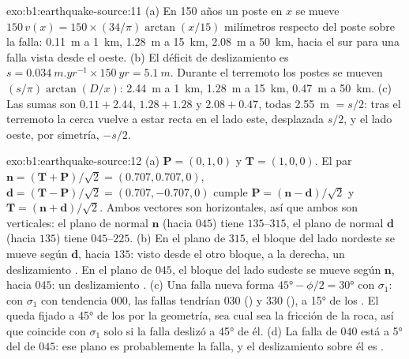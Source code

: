 \begin{solution}{exo:b1:earthquake-source:11}
(a) En 150 años un poste en $x$ se mueve $150\,v(x) = 150\times(34/\pi)
\arctan(x/15)$ milímetros respecto del poste sobre la falla: \qty{0.11}{m} a
\qty{1}{km}, \qty{1.28}{m} a \qty{15}{km}, \qty{2.08}{m} a \qty{50}{km},
hacia el sur para una falla  vista desde el oeste. (b) El déficit de deslizamiento es
$s = \qty{0.034}{m.yr^{-1}}\times\qty{150}{yr} = \qty{5.1}{m}$. Durante el
terremoto los postes se mueven $(s/\pi)\arctan(D/x)$: \qty{2.44}{m} a
\qty{1}{km}, \qty{1.28}{m} a \qty{15}{km}, \qty{0.47}{m} a \qty{50}{km}.
(c) Las sumas son $0.11 + 2.44$, $1.28 + 1.28$ y $2.08 + 0.47$, todas
\qty{2.55}{m} $= s/2$: tras el terremoto la cerca vuelve a estar recta en el lado
este, desplazada $s/2$, y el lado oeste, por simetría, $-s/2$.
\end{solution}

\begin{solution}{exo:b1:earthquake-source:12}
(a) $\mathbf P = (0, 1, 0)$ y $\mathbf T = (1, 0, 0)$. El par
$\mathbf n = (\mathbf T + \mathbf P)/\sqrt2 = (0.707, 0.707, 0)$,
$\mathbf d = (\mathbf T - \mathbf P)/\sqrt2 = (0.707, -0.707, 0)$ cumple
$\mathbf P = (\mathbf n - \mathbf d)/\sqrt2$ y $\mathbf T = (\mathbf n +
\mathbf d)/\sqrt2$. Ambos vectores son horizontales, así que ambos  son
verticales: el plano de normal $\mathbf n$ (hacia $045$) tiene  $135$--$315$,
el plano de normal $\mathbf d$ (hacia $135$) tiene  $045$--$225$. (b) En el
plano de  $315$, el bloque del lado nordeste se mueve según $\mathbf d$,
hacia $135$: visto desde el otro bloque, a la derecha, un deslizamiento . En el
plano de  $045$, el bloque del lado sudeste se mueve según $\mathbf n$,
hacia $045$: un deslizamiento . (c) Una falla nueva forma $\ang{45} - \phi/2 =
\ang{30}$ con $\sigma_1$: con $\sigma_1$ con tendencia $000$, las fallas
tendrían  $030$ () y $330$ (), a \ang{15} de los .
El  queda fijado a \ang{45} de los  por la geometría, sea cual sea
la fricción de la roca, así que coincide con $\sigma_1$ solo si la falla deslizó
a \ang{45} de él. (d) La falla de  $040$ está a \ang{5} del  de  $045$:
ese plano es probablemente la falla, y el deslizamiento sobre él es
.
\end{solution}

